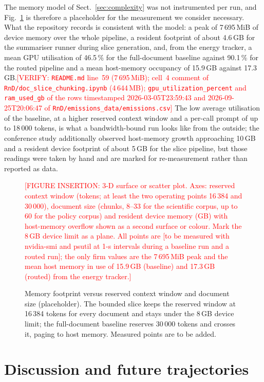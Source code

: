 \documentclass[pdflatex,sn-mathphys-num]{sn-jnl}
\newcommand{\todo}[1]{\textcolor{red}{#1}}
\newcommand{\verify}[1]{\todo{[VERIFY: #1]}}
\theoremstyle{thmstyleone}%
\theoremstyle{thmstylethree}%
\begin{document}
The memory model of Sect.~\ref{sec:complexity} was not instrumented per run, and Fig.~\ref{fig:memory-surface} is therefore a placeholder for the measurement we consider necessary. What the repository records is consistent with the model: a peak of 7\,695\,MiB of device memory over the whole pipeline, a resident footprint of about 4.6\,GB for the summariser runner during slice generation, and, from the energy tracker, a mean GPU utilisation of 46.5\,\% for the full-document baseline against 90.1\,\% for the routed pipeline and a mean host-memory occupancy of 15.9\,GB against 17.3\,GB.\verify{\texttt{README.md} line~59 (7\,695\,MiB); cell~4 comment of \texttt{RnD/doc\_slice\_chunking.ipynb} (4\,644\,MB); \texttt{gpu\_utilization\_percent} and \texttt{ram\_used\_gb} of the rows timestamped 2026-03-05T23:59:43 and 2026-09-25T20:06:47 of \texttt{RnD/emissions\_data/emissions.csv}} The low average utilisation of the baseline, at a higher reserved context window and a per-call prompt of up to 18\,000 tokens, is what a bandwidth-bound run looks like from the outside; the conference study additionally observed host-memory growth approaching 10\,GB and a resident device footprint of about 5\,GB for the slice pipeline, but those readings were taken by hand and are marked for re-measurement rather than reported as data.

\begin{figure}[htbp]
  \centering
  \todo{[FIGURE INSERTION: 3-D surface or scatter plot. Axes: reserved context window (tokens; at least the two operating points 16\,384 and 30\,000), document size (chunks, 8--33 for the scientific corpus, up to 60 for the policy corpus) and resident device memory (GB) with host-memory overflow shown as a second surface or colour. Mark the 8\,GB device limit as a plane. All points are \todo{[to be measured with nvidia-smi and psutil at 1-s intervals during a baseline run and a routed run]}; the only firm values are the 7\,695\,MiB peak and the mean host memory in use of 15.9\,GB (baseline) and 17.3\,GB (routed) from the energy tracker.]}
  \caption{Memory footprint versus reserved context window and document size (placeholder). The bounded slice keeps the reserved window at 16\,384 tokens for every document and stays under the 8\,GB device limit; the full-document baseline reserves 30\,000 tokens and crosses it, paging to host memory. Measured points are to be added.}
  \label{fig:memory-surface}
\end{figure}

\section{Discussion and future trajectories}\label{sec:discussion}
\end{document}
